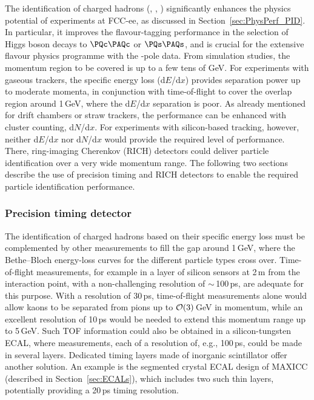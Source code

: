 The identification of charged hadrons (\PGp, \PK, \Pp) 
significantly enhances the physics potential of experiments at FCC-ee, as discussed in Section~\ref{sec:PhysPerf_PID}.  
In particular, it improves the flavour-tagging performance in the selection of 
Higgs boson decays to $\PQc\PAQc$ or $\PQs\PAQs$, 
and is crucial for the extensive flavour physics programme with the \PZ-pole data. 
From simulation studies, the momentum region to be covered is up to a few tens of GeV.
For experiments with gaseous trackers, 
the specific energy loss (d$E$/d$x$) provides separation power up to moderate momenta, 
in conjunction with time-of-flight to cover the overlap region around 1\,GeV, where the d$E$/d$x$ separation is poor. 
As already mentioned for drift chambers or straw trackers, the performance can be enhanced with cluster counting, d$N$/d$x$. 
For experiments with silicon-based tracking, however, neither d$E$/d$x$ nor d$N$/d$x$ would provide the required level of performance. 
There, ring-imaging Cherenkov (RICH) detectors could deliver particle identification over a very wide momentum range. 
The following two sections describe the use of precision timing and RICH detectors 
to enable the required particle identification performance. 

\subsubsection{Precision timing detector}

The identification of charged hadrons based on their specific energy loss 
must be complemented by other measurements to fill the gap around 1\,GeV, 
where the Bethe--Bloch energy-loss curves for the different particle types cross over. 
Time-of-flight measurements, for example in a layer of silicon sensors at 2\,m from the interaction point, 
with a non-challenging resolution of $\sim$\,100\,ps, are adequate for this purpose. 
With a resolution of 30\,ps, 
time-of-flight measurements alone would allow kaons to be separated from pions up to ${\cal{O}}(3)$\,GeV in momentum, 
while an excellent resolution of 10\,ps would be needed to extend this momentum range up to 5\,GeV.
Such TOF information could also be obtained in a silicon-tungsten ECAL, 
where measurements, each of a resolution of, e.g., 100\,ps, could be made in several layers.  
Dedicated timing layers made of inorganic scintillator offer another solution. 
An example is the segmented crystal ECAL design of MAXICC (described in Section~\ref{sec:ECALs}), 
which includes two such thin layers, potentially providing a 20\,ps timing resolution. 

